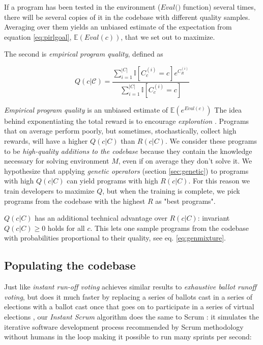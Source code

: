 If a program has been tested in the environment ($\textit{Eval()}$ function) several times, there will be several copies of it in the codebase with different quality samples.
Averaging over them yields an unbiased estimate of the expectation from equation \ref{eq:pirlgoal}, $\mathbb{E}(\mathit{Eval}(c))$, that we set out to maximize.

The second is \emph{empirical program quality}, defined as

\begin{equation}
    Q(c|\mathcal{C}) = \frac{\sum\limits_{i=1}^{|C|} \mathbb{I}[C_c^{(i)}=c] e^{C_R^{(i)}}}{\sum\limits_{i=1}^{|C|} \mathbb{I}[C_c^{(i)}=c]}
    \label{eq:empquality}
\end{equation}

\emph{Empirical program quality} is an unbiased estimate of $\mathbb{E}(e^{\mathit{Eval}(c)})$
The idea behind exponentiating the total reward is to encourage \emph{exploration} \cite{exploration}.
Programs that on average perform poorly, but sometimes, stochastically, collect high rewards, will have a higher $Q(c|C)$ than $R(c|C)$.
We consider these programs to be \emph{high-quality additions to the codebase} because they contain the knowledge necessary for solving environment $M$, even if on average they don't solve it.
We hypothesize that applying \emph{genetic operators} (section \ref{sec:genetic}) to programs with high $Q(c|C)$ can yield programs with high $R(c|C)$.
For this reason we train developers to maximize $Q$, but when the training is complete, we pick programs from the codebase with the highest $R$ as "best programs".
 
$Q(c|C)$ has an additional technical advantage over $R(c|C)$: invariant $Q(c|C) \geq 0$ holds for all $c$.
This lets one sample programs from the codebase with probabilities proportional to their quality, see eq. \ref{eq:genmixture}.

\subsection{Populating the codebase}

Just like \emph{instant run-off voting} achieves similar results to \emph{exhaustive ballot runoff voting}, but does it much faster by replacing a series of ballots cast in a series of elections with a ballot cast once that goes on to participate in a series of virtual elections \cite{votingsystems}, our \emph{Instant Scrum} algorithm does the same to Scrum \cite{scrum}: it simulates the iterative software development process recommended by Scrum methodology without humans in the loop making it possible to run many sprints per second:

